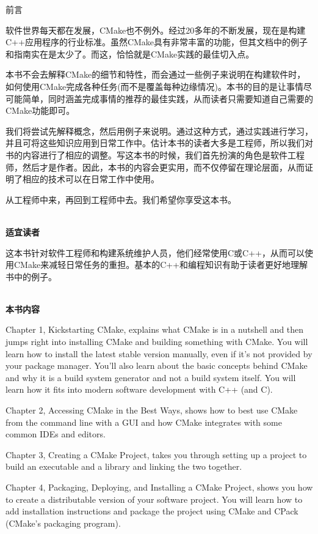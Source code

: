 \begin{flushright}
	 前言
\end{flushright}

软件世界每天都在发展，CMake也不例外。经过20多年的不断发展，现在是构建C++应用程序的行业标准。虽然CMake具有非常丰富的功能，但其文档中的例子和指南实在是太少了。而这，恰恰就是CMake实践的最佳切入点。

本书不会去解释CMake的细节和特性，而会通过一些例子来说明在构建软件时，如何使用CMake完成各种任务(而不是覆盖每种边缘情况)。本书的目的是让事情尽可能简单，同时涵盖完成事情的推荐的最佳实践，从而读者只需要知道自己需要的CMake功能即可。

我们将尝试先解释概念，然后用例子来说明。通过这种方式，通过实践进行学习，并且可将这些知识应用到日常工作中。估计本书的读者大多是工程师，所以我们对书的内容进行了相应的调整。写这本书的时候，我们首先扮演的角色是软件工程师，然后才是作者。因此，本书的内容会更实用，而不仅停留在理论层面，从而证明了相应的技术可以在日常工作中使用。

从工程师中来，再回到工程师中去。我们希望你享受这本书。

\hspace*{\fill} \\ %
\textbf{适宜读者}

这本书针对软件工程师和构建系统维护人员，他们经常使用C或C++，从而可以使用CMake来减轻日常任务的重担。基本的C++和编程知识有助于读者更好地理解书中的例子。

\hspace*{\fill} \\ %
\textbf{本书内容}

Chapter 1, Kickstarting CMake, explains what CMake is in a nutshell and then jumps right into installing CMake and building something with CMake. You will learn how to install the latest stable version manually, even if it's not provided by your package manager. You'll also learn about the basic concepts behind CMake and why it is a build system generator and not a build system itself. You will learn how it fits into modern software development with C++ (and C).

Chapter 2, Accessing CMake in the Best Ways, shows how to best use CMake from the command line with a GUI and how CMake integrates with some common IDEs and editors.

Chapter 3, Creating a CMake Project, takes you through setting up a project to build an executable and a library and linking the two together.

Chapter 4, Packaging, Deploying, and Installing a CMake Project, shows you how to create a distributable version of your software project. You will learn how to add installation instructions and package the project using CMake and CPack (CMake's packaging program).

